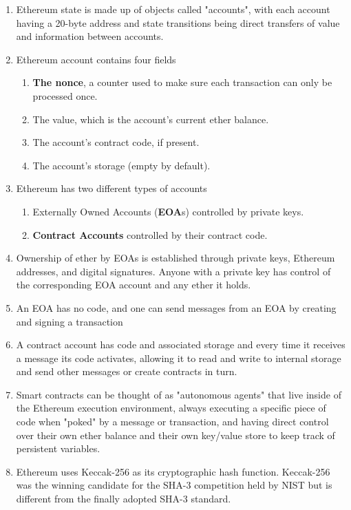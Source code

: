 \begin{enumerate}
\item Ethereum state is made up of objects called "accounts", with each account having a 20-byte address and state transitions being direct transfers of value and information between accounts.

\item Ethereum account contains four fields
\begin{enumerate}
\item\textbf{The nonce}, a counter used to make sure each transaction can only be processed once.
\item{The value}, which is the account's current ether balance.
\item The account's contract code, if present.
\item The account's storage (empty by default).
\end{enumerate}

\item Ethereum has two different types of accounts
\begin{enumerate}
\item Externally Owned Accounts (\textbf{EOA}s) controlled by private keys.
\item \textbf{Contract Accounts} controlled by their contract code.
\end{enumerate}

\item Ownership of ether by EOAs is established through private keys, Ethereum addresses, and digital signatures. Anyone with a private key has control of the corresponding EOA account and any ether it holds.

\item An EOA has no code, and one can send messages from an EOA by creating and signing a transaction

\item A contract account has code and associated storage and every time it receives a message its code activates, allowing it to read and write to internal storage and send other messages or create contracts in turn.

\item Smart contracts can be thought of as "autonomous agents" that live inside of the Ethereum execution environment, always executing a specific piece of code when "poked" by a message or transaction, and having direct control over their own ether balance and their own key/value store to keep track of persistent variables.

\item Ethereum uses Keccak-256 as its cryptographic hash function. Keccak-256 was the winning candidate for the SHA-3 competition held by NIST but is different from the finally adopted SHA-3 standard.


\end{enumerate}
